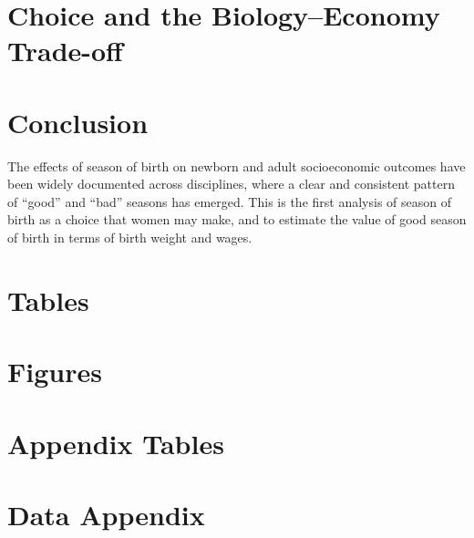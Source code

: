 \documentclass[a4paper, 12 pt]{article}
\theoremstyle{plain}
\begin{document}
\begin{doublespace}
\section{Choice and the Biology--Economy Trade-off}

\section{Conclusion}
The effects of season of birth on newborn and adult socioeconomic outcomes have been widely documented across disciplines, where a clear and consistent pattern of ``good'' and ``bad'' seasons has emerged. This is the first analysis of season of birth as a choice that women may make, and to estimate the value of good season of birth in terms of birth weight and wages.



\newpage
%
%
%





\newpage
\section*{Tables}



\newpage
\section*{Figures}



\appendix
\section{Appendix Tables}


\clearpage
%


\section{Data Appendix}
\label{bqScn:datApp}

\end{doublespace}
\end{document}
